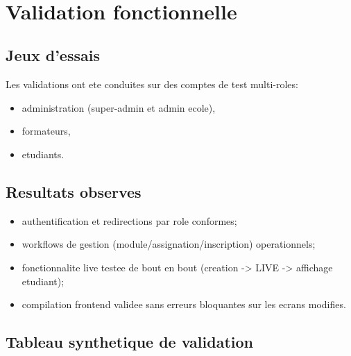 ﻿﻿\documentclass[12pt,a4paper,oneside]{report}
\begin{document}
\section{Validation fonctionnelle}

\subsection{Jeux d'essais}

Les validations ont ete conduites sur des comptes de test multi-roles:
\begin{itemize}
  \item administration (super-admin et admin ecole),
  \item formateurs,
  \item etudiants.
\end{itemize}

\subsection{Resultats observes}

\begin{itemize}
  \item authentification et redirections par role conformes;
  \item workflows de gestion (module/assignation/inscription) operationnels;
  \item fonctionnalite live testee de bout en bout (creation -> LIVE -> affichage etudiant);
  \item compilation frontend validee sans erreurs bloquantes sur les ecrans modifies.
\end{itemize}

\subsection{Tableau synthetique de validation}
\end{document}
